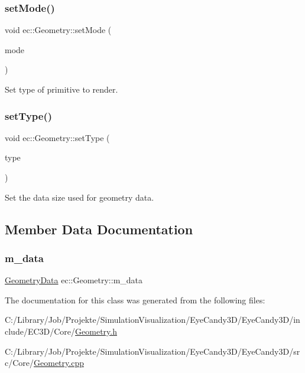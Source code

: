 \subsubsection{\texorpdfstring{set\+Mode()}{setMode()}}
{\footnotesize\ttfamily void ec\+::\+Geometry\+::set\+Mode (\begin{DoxyParamCaption}\item[{G\+Lenum}]{mode }\end{DoxyParamCaption})\hspace{0.3cm}{\ttfamily [protected]}}



Set type of primitive to render. 

\mbox{\label{classec_1_1_geometry_a12c3da280ff11e86a8b07d18a23e0880}} 
\subsubsection{\texorpdfstring{set\+Type()}{setType()}}
{\footnotesize\ttfamily void ec\+::\+Geometry\+::set\+Type (\begin{DoxyParamCaption}\item[{G\+Lenum}]{type }\end{DoxyParamCaption})\hspace{0.3cm}{\ttfamily [protected]}}



Set the data size used for geometry data. 



\subsection{Member Data Documentation}
\mbox{\label{classec_1_1_geometry_aeb72a472b242d92496f0283cfee17fac}} 
\subsubsection{\texorpdfstring{m\+\_\+data}{m\_data}}
{\footnotesize\ttfamily \mbox{\hyperlink{classec_1_1_geometry_data}{Geometry\+Data}} ec\+::\+Geometry\+::m\+\_\+data\hspace{0.3cm}{\ttfamily [protected]}}



The documentation for this class was generated from the following files\+:\begin{DoxyCompactItemize}
\item 
C\+:/\+Library/\+Job/\+Projekte/\+Simulation\+Visualization/\+Eye\+Candy3\+D/\+Eye\+Candy3\+D/include/\+E\+C3\+D/\+Core/\mbox{\hyperlink{_geometry_8h}{Geometry.\+h}}\item 
C\+:/\+Library/\+Job/\+Projekte/\+Simulation\+Visualization/\+Eye\+Candy3\+D/\+Eye\+Candy3\+D/src/\+Core/\mbox{\hyperlink{_geometry_8cpp}{Geometry.\+cpp}}\end{DoxyCompactItemize}
